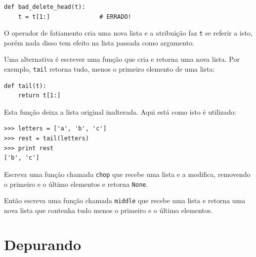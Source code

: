 \beforeverb
\begin{verbatim}
def bad_delete_head(t):
    t = t[1:]              # ERRADO!
\end{verbatim}
\afterverb

O operador de fatiamento cria uma nova lista e a atribuição faz {\tt t} se referir a isto,
porém nada disso tem efeito na lista passada como argumento.


Uma alternativa é escrever uma função que cria e retorna uma nova lista.
Por exemplo, {\tt tail} retorna tudo, menos o primeiro elemento de uma lista: 

\beforeverb
\begin{verbatim}
def tail(t):
    return t[1:]
\end{verbatim}
\afterverb
%

Esta função deixa a lista original inalterada.
Aqui está como isto é utilizado:

\beforeverb
\begin{verbatim}
>>> letters = ['a', 'b', 'c']
>>> rest = tail(letters)
>>> print rest
['b', 'c']
\end{verbatim}
\afterverb

\begin{ex}

Escreva uma função chamada {\tt chop} que recebe uma lista e a modifica,
removendo o primeiro e o último elementos e retorna {\tt None}.

Então escreva uma função chamada {\tt middle} que recebe uma lista e retorna
uma nova lista que contenha tudo menos o primeiro e o último elementos.

\end{ex}

\section{Depurando}

